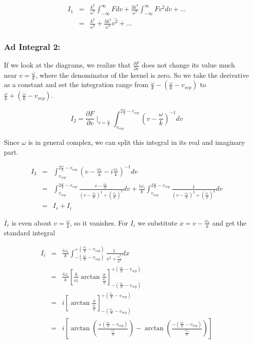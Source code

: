 \documentclass[a4paper,10pt]{report}
\begin{document}
\begin{eqnarray}
    I_1&=& \frac{k^2}{\omega^2} \int^{\infty}_{-\infty } F dv + \frac{3 k^4}{\omega^4} \int^{\infty}_{-\infty } {Fv^2 dv} + ... \\
&=& \frac{k^2}{\omega^2}  + \frac{3 k^4}{\omega^4} \bar{v^2} + ...\label{result_I1}
\end{eqnarray}

\subsubsection{Ad Integral 2:}
If we look at the diagrams, we realize that $\frac{\partial F}{\partial v}$ does not change its value much near $v=\frac{\omega}{k}$, where the denominator of the kernel is zero. So we take the derivative as a constant and set the integration range from $\frac{\omega}{k}- \left( \frac{\omega}{k}- v_{sep} \right)$ to $\frac{\omega}{k}+\left( \frac{\omega}{k}- v_{sep} \right)$.

\begin{equation}
    I_2= \frac{\partial F}{\partial v}\mid_{v=\frac{\omega}{k}} \int^{2\frac{ \omega}{k} - v_{sep} }_{v_{sep}} {\left( v-\frac{\omega}{k} \right)^{-1} dv }
\end{equation}

Since $\omega$ is in general complex, we can split this integral in its real and imaginary part.

\begin{eqnarray}
  I_3 &=& \int^{2\frac{ \omega}{k} - v_{sep}}_{v_{sep}} {\left( v-\frac{\omega_r}{k} -i\frac{\omega_i}{k}\right)^{-1} dv } \\
 &=& \int^{2\frac{ \omega}{k} - v_{sep}}_{v_{sep}}{\frac{v-\frac{\omega_r}{k}}{\left( v-\frac{\omega_r}{k} \right)^2+\left( \frac{\omega_i}{k} \right)^2} dv } +  \frac{i\omega_i}{k}\int^{2\frac{ \omega}{k} - v_{sep}}_{v_{sep}}{\frac{1}{\left( v-\frac{\omega_r}{k} \right)^2+\left( \frac{\omega_i}{k} \right)^2} dv } \\
 &=& I_r+I_i
 \end{eqnarray}

$I_r$ is even about $v=\frac{\omega}{k}$, so it vanishes. For $I_i$ we substitute $x=v-\frac{\omega_r}{k}$ and get the standard integral

\begin{eqnarray}
    I_i&=&\frac{i\omega_i}{k} \int^{+(\frac{\omega_r}{k}- v_{sep})}_{-(\frac{\omega_r}{k}- v_{sep})}{\frac{1}{x^2+\frac{\omega_i^2}{k^2}}dx} \\
&=& \frac{i\omega_i}{k} \left[ \frac{k}{\omega_i} \arctan{\frac{x}{\frac{\omega_i}{k}}}\right]_{-(\frac{\omega_r}{k}- v_{sep})}^{+(\frac{\omega_r}{k}- v_{sep})} \\
&=& i \left[ \arctan{\frac{x}{\frac{\omega_i}{k}}}\right]_{-(\frac{\omega_r}{k}- v_{sep})}^{+(\frac{\omega_r}{k}- v_{sep})} \\
&=& i \left[ \arctan \left(\frac{+(\frac{\omega_r}{k}- v_{sep})}{\frac{\omega_i}{k}}\right) - \arctan \left( \frac{-(\frac{\omega_r}{k}- v_{sep})}{\frac{\omega_i}{k}}\right) \right]
\end{eqnarray}
\end{document}
